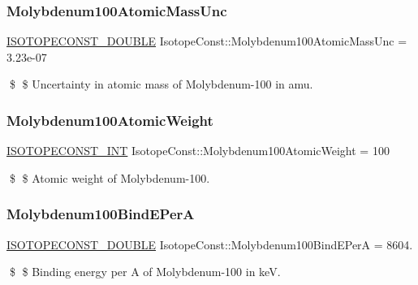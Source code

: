 \subsubsection{\texorpdfstring{Molybdenum100\+Atomic\+Mass\+Unc}{Molybdenum100AtomicMassUnc}}
{\footnotesize\ttfamily \mbox{\hyperlink{group___isotope_const-_macros_ga8f45a7272ce02c0b4c65c44636ed719a}{I\+S\+O\+T\+O\+P\+E\+C\+O\+N\+S\+T\+\_\+\+D\+O\+U\+B\+LE}} Isotope\+Const\+::\+Molybdenum100\+Atomic\+Mass\+Unc = 3.\+23e-\/07}

\$ \$ Uncertainty in atomic mass of Molybdenum-\/100 in amu. \mbox{\label{group___isotope_const-_molybdenum-_mo100_ga47add7a01f8291960c4c96741588d5f2}} 
\subsubsection{\texorpdfstring{Molybdenum100\+Atomic\+Weight}{Molybdenum100AtomicWeight}}
{\footnotesize\ttfamily \mbox{\hyperlink{group___isotope_const-_macros_ga5f18360b3e99483a35c32d789e62621c}{I\+S\+O\+T\+O\+P\+E\+C\+O\+N\+S\+T\+\_\+\+I\+NT}} Isotope\+Const\+::\+Molybdenum100\+Atomic\+Weight = 100}

\$ \$ Atomic weight of Molybdenum-\/100. \mbox{\label{group___isotope_const-_molybdenum-_mo100_ga4ccee67b5ce4de1594c3f4afba0d0e9f}} 
\subsubsection{\texorpdfstring{Molybdenum100\+Bind\+E\+PerA}{Molybdenum100BindEPerA}}
{\footnotesize\ttfamily \mbox{\hyperlink{group___isotope_const-_macros_ga8f45a7272ce02c0b4c65c44636ed719a}{I\+S\+O\+T\+O\+P\+E\+C\+O\+N\+S\+T\+\_\+\+D\+O\+U\+B\+LE}} Isotope\+Const\+::\+Molybdenum100\+Bind\+E\+PerA = 8604.}

\$ \$ Binding energy per A of Molybdenum-\/100 in keV. \mbox{\label{group___isotope_const-_molybdenum-_mo100_ga2d61070e130897c2a5145aa5b622ecc4}} 
